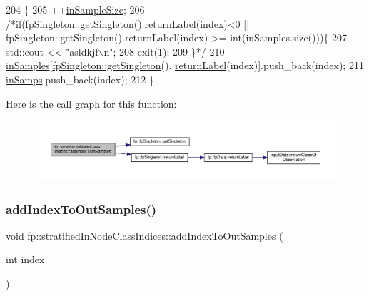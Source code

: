 \begin{DoxyCode}
204                                                       \{
205                 ++\hyperlink{classfp_1_1stratifiedInNodeClassIndices_a2acb617e3212806ae7f994d925bd1468}{inSampleSize};
206                 \textcolor{comment}{/*if(fpSingleton::getSingleton().returnLabel(index)<0 ||
       fpSingleton::getSingleton().returnLabel(index) >= int(inSamples.size()))\{}
207 \textcolor{comment}{                    std::cout << "asldkjf\(\backslash\)n";}
208 \textcolor{comment}{                    exit(1);}
209 \textcolor{comment}{                    \}*/}
210                 \hyperlink{classfp_1_1stratifiedInNodeClassIndices_a6bfa636c77b48163f5d245959ea753d0}{inSamples}[\hyperlink{classfp_1_1fpSingleton_a8bdae77b68521003e3fc630edec2e240}{fpSingleton::getSingleton}().
      \hyperlink{classfp_1_1fpSingleton_aa2f644b1521948fb994f4087ddfaea14}{returnLabel}(index)].push\_back(index);
211                 \hyperlink{classfp_1_1stratifiedInNodeClassIndices_ab6be4d82677c462494a4b4ef90c79bde}{inSamps}.push\_back(index);
212             \}
\end{DoxyCode}
Here is the call graph for this function\+:\nopagebreak
\begin{figure}[H]
\begin{center}
\leavevmode
\includegraphics[width=350pt]{classfp_1_1stratifiedInNodeClassIndices_a493b23961e38f5f534c236a22b4ff4b6_cgraph}
\end{center}
\end{figure}
\mbox{\label{classfp_1_1stratifiedInNodeClassIndices_adc99a046031545bc59c2b43abcf75ed9}} 
\subsubsection{\texorpdfstring{add\+Index\+To\+Out\+Samples()}{addIndexToOutSamples()}}
{\footnotesize\ttfamily void fp\+::stratified\+In\+Node\+Class\+Indices\+::add\+Index\+To\+Out\+Samples (\begin{DoxyParamCaption}\item[{int}]{index }\end{DoxyParamCaption})\hspace{0.3cm}{\ttfamily [inline]}}




